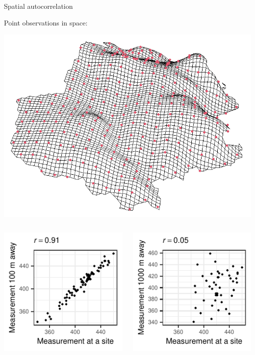\documentclass[
  ignorenonframetext,
]{beamer}
\begin{document}
\begin{frame}{Spatial autocorrelation}
\small

Point observations in space:

\includegraphics[width=10.17in,height=0.3\textheight]{terrain2}

\begin{columns}[T]
\begin{column}{0.48\textwidth}
\includegraphics{Lecture_1_files/figure-beamer/unnamed-chunk-5-1.pdf}
\end{column}

\begin{column}{0.48\textwidth}
\includegraphics{Lecture_1_files/figure-beamer/unnamed-chunk-6-1.pdf}
\end{column}
\end{columns}
\end{frame}
\end{document}
